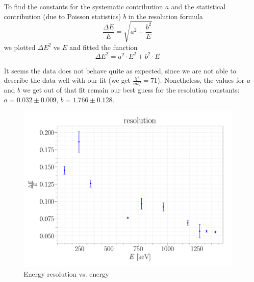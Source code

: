 \documentclass[a4paper,12pt]{article}
\begin{document}
To find the constants for the systematic contribution $a$ and the statistical contribution (due to Poisson statistics) $b$ in the resolution formula 
\begin{equation}
	\frac{\Delta E}{E} = \sqrt{a^2+ \frac{b^2}{E}}
\end{equation}
we plotted $\Delta E^2$ vs $E$ and fitted the function 
\begin{equation}
	\Delta E^2 = a^2 \cdot E^2 + b^2 \cdot E
\end{equation}

It seems the data does not behave quite as expected, since we are not able to describe the data well with our fit (we get $\frac{\chi^2}{ndf} = 71$). Nonetheless, the values for $a$ and $b$ we get out of that fit remain our best guess for the resolution constants: $a = 0.032\pm0.009$, $b = 1.766\pm0.128$.

\begin{figure}[H]
\centering
\includegraphics[scale=0.25]{../Figures/resolution.pdf}
\caption{Energy resolution vs. energy}
\label{resolution}
\end{figure}
\newpage
\end{document}
